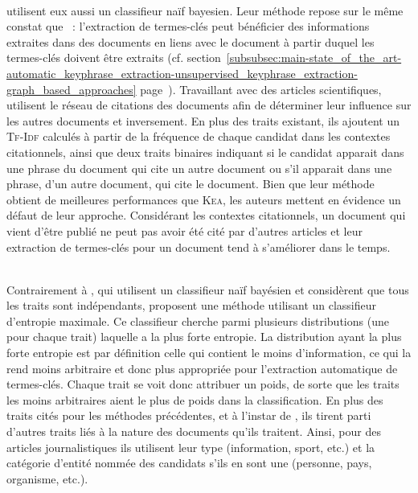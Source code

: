         ~\\ utilisent
        eux aussi un classifieur naïf bayesien. Leur méthode repose sur le même
        constat que ~: l'extraction de termes-clés
        peut bénéficier des informations extraites dans des documents en liens
        avec le document à partir duquel les termes-clés doivent être extraits
        (cf.
        section~\ref{subsubsec:main-state_of_the_art-automatic_keyphrase_extraction-unsupervised_keyphrase_extraction-graph_based_approaches}
        page~\pageref{subsubsec:main-state_of_the_art-automatic_keyphrase_extraction-unsupervised_keyphrase_extraction-graph_based_approaches}).
        Travaillant avec des articles scientifiques,
         utilisent le
        réseau de citations des documents afin de déterminer leur influence sur
        les autres documents et inversement. En plus des traits existant, ils
        ajoutent un \textsc{Tf-Idf} calculés à partir de la fréquence de chaque
        candidat dans les contextes citationnels, ainsi que deux traits binaires
        indiquant si le candidat apparait dans une phrase du document qui cite
        un autre document ou s'il apparait dans une phrase, d'un autre document,
        qui cite le document. Bien que leur méthode obtient de meilleures
        performances que \textsc{Kea}, les auteurs mettent en évidence un défaut
        de leur approche. Considérant les contextes citationnels, un document
        qui vient d'être publié ne peut pas avoir été cité par d'autres articles
        et leur extraction de termes-clés pour un document tend à s'améliorer
        dans le temps.

        ~\\Contrairement à , qui utilisent un classifieur
        naïf bayésien et considèrent que tous les traits sont indépendants,
         proposent une méthode utilisant un
        classifieur d'entropie maximale. Ce classifieur cherche parmi plusieurs
        distributions (une pour chaque trait) laquelle a la plus forte entropie.
        La distribution ayant la plus forte entropie est par définition celle
        qui contient le moins d'information, ce qui la rend moins arbitraire et
        donc plus appropriée pour l'extraction automatique de termes-clés.
        Chaque trait se voit donc attribuer un poids, de sorte que les traits
        les moins arbitraires aient le plus de poids dans la classification. En
        plus des traits cités pour les méthodes précédentes, et à l'instar de
        , ils tirent parti d'autres
        traits liés à la nature des documents qu'ils traitent. Ainsi, pour des
        articles journalistiques ils utilisent leur type (information, sport,
        etc.) et la catégorie d'entité nommée des candidats s'ils en sont une
        (personne, pays, organisme, etc.).

